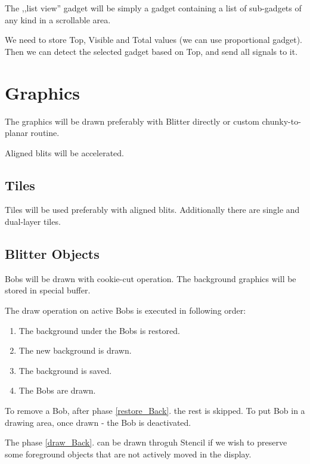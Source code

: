\documentclass[12pt]{article}
\begin{document}
The ,,list view'' gadget will be simply a gadget containing a list of sub-gadgets of any kind in a scrollable area.

We need to store Top, Visible and Total values (we can use proportional gadget). Then we can detect the selected gadget based on Top, and send all signals to it.

\section{Graphics}

The graphics will be drawn preferably with Blitter directly or custom chunky-to-planar routine.

Aligned blits will be accelerated.

\subsection{Tiles}

Tiles will be used preferably with aligned blits. Additionally there are single and dual-layer tiles.

\subsection{Blitter Objects}

Bobs will be drawn with cookie-cut operation. The background graphics will be stored in special buffer.

The draw operation on active Bobs is executed in following order:
\begin{enumerate}
\item \label{restore_Back} The background under the Bobs is restored.
\item \label{draw_Back} The new background is drawn.
\item The background is saved.
\item \label{draw_Bobs} The Bobs are drawn.
\end{enumerate}
To remove a Bob, after phase \ref{restore_Back}. the rest is skipped. To put Bob in a drawing area, once drawn - the Bob is deactivated.

The phase \ref{draw_Back}. can be drawn throguh Stencil if we wish to preserve some foreground objects that are not actively moved in the display.
\end{document}
